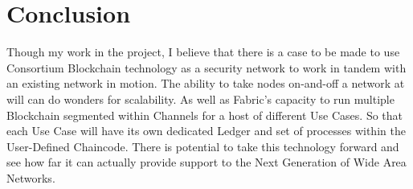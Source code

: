 \section{Conclusion}
	\hspace{10mm}Though my work in the project, I believe that there is a case to be made to use Consortium Blockchain technology as a security network to work in tandem with an existing network in motion. The ability to take nodes on-and-off a network at will can do wonders for scalability. As well as Fabric's capacity to run multiple Blockchain segmented within Channels for a host of different Use Cases. So that each Use Case will have its own dedicated Ledger and set of processes within the User-Defined Chaincode. There is potential to take this technology forward and see how far it can actually provide support to the Next Generation of Wide Area Networks.